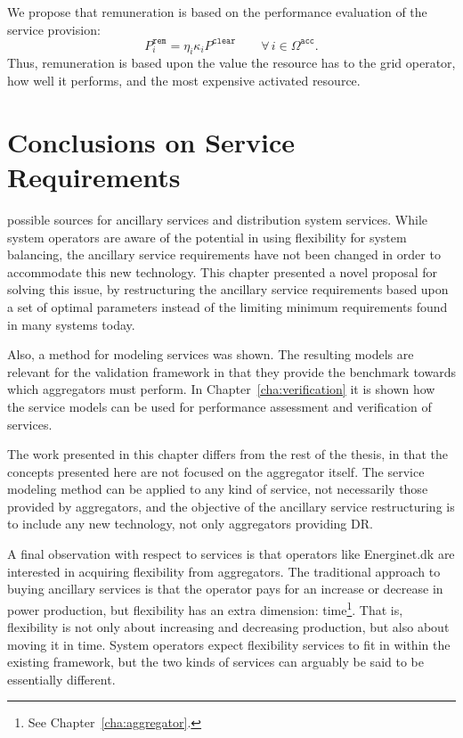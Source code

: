 We propose that remuneration is based on the performance evaluation of the service provision:
\begin{equation}
	P^\mathtt{rem}_i = \eta_i\kappa_i  P^\mathtt{clear} \qquad \forall \, i \in \Omega^\mathtt{acc}.
\end{equation}
Thus, remuneration is based upon the value the resource has to the grid operator, how well it performs, and the most expensive activated resource.


\section{Conclusions on Service Requirements} %
\label{sec:ConclusionsServiceRequirements}
 possible sources for ancillary services and distribution system services. While system operators are aware of the potential in using flexibility for system balancing, the ancillary service requirements have not been changed in order to accommodate this new technology. This chapter presented a novel proposal for solving this issue, by restructuring the ancillary service requirements based upon a set of optimal parameters instead of the limiting minimum requirements found in many systems today.

Also, a method for modeling services was shown. The resulting models are relevant for the validation framework in that they provide the benchmark towards which aggregators must perform. In Chapter~\ref{cha:verification} it is shown how the service models can be used for performance assessment and verification of services.

The work presented in this chapter differs from the rest of the thesis, in that the concepts presented here are not focused on the aggregator itself. The service modeling method can be applied to any kind of service, not necessarily those provided by aggregators, and the objective of the ancillary service restructuring is to include any new technology, not only aggregators providing DR.

A final observation with respect to services is that operators like Energinet.dk are interested in acquiring flexibility from aggregators. The traditional approach to buying ancillary services is that the operator pays for an increase or decrease in power production, but flexibility has an extra dimension: time\footnote{See Chapter~\ref{cha:aggregator}.}. That is, flexibility is not only about increasing and decreasing production, but also about moving it in time. System operators expect flexibility services to fit in within the existing framework, but the two kinds of services can arguably be said to be essentially different. 

